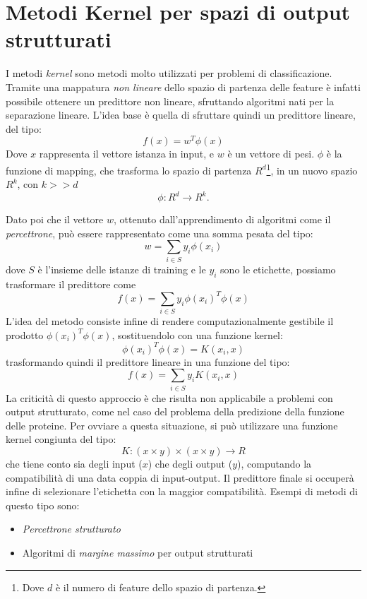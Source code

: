 \documentclass[12pt]{report}
\begin{document}
\section{Metodi Kernel per spazi di output strutturati}
I metodi \emph{kernel} sono metodi molto utilizzati per problemi di classificazione. Tramite una mappatura \emph{non lineare} dello spazio di partenza delle feature è infatti possibile ottenere un predittore non lineare, sfruttando algoritmi nati per la separazione lineare. L'idea base è quella di sfruttare quindi un predittore lineare, del tipo:
\[
f(x) = w^T \phi(x)
\]
Dove $x$ rappresenta il vettore istanza in input, e $w$ è un vettore di pesi. $\phi$ è la funzione di mapping, che trasforma lo spazio di partenza $R^d$\footnote{\footnotesize{Dove $d$ è il numero di feature dello spazio di partenza.}}, in un nuovo spazio $R^k$, con $k>>d$
\[
\phi : R^d \rightarrow R^k.
\]

Dato poi che il vettore $w$, ottenuto dall'apprendimento di algoritmi come il \emph{percettrone}\cite{PERC}, può essere rappresentato come una somma pesata del tipo:
\[
w = \sum_{i \in S} y_i \phi(x_i)
\]
dove $S$ è l'insieme delle istanze di training e le $y_i$ sono le etichette, possiamo trasformare il predittore come
\[
f(x) = \sum_{i\in S} y_i \phi(x_i)^T \phi(x)
\]
L'idea del metodo consiste infine di rendere computazionalmente gestibile il prodotto $\phi(x_i)^T \phi(x)$, sostituendolo con una funzione kernel:
\[
\phi(x_i)^T \phi(x) = K(x_i, x)
\]
trasformando quindi il predittore lineare in una funzione del tipo:
\[
f(x) = \sum_{i \in S} y_i K(x_i, x)
\]
La criticità di questo approccio è che risulta non applicabile a problemi con output strutturato, come nel caso del problema della predizione della funzione delle proteine. Per ovviare a questa situazione, si può utilizzare una funzione kernel congiunta del tipo:
\[
K : (x \times y) \times (x \times y) \rightarrow R
\]
che tiene conto sia degli input ($x$) che degli output ($y$), computando la compatibilità di una data coppia di input-output. Il predittore finale si occuperà infine di selezionare l'etichetta con la maggior compatibilità.
\newline
\newline
Esempi di metodi di questo tipo sono:
\begin{itemize}
\item \emph{Percettrone strutturato} \cite{perceptron}
\item Algoritmi di \emph{margine massimo} per output strutturati \cite{marginemassimo}
\end{itemize}
\end{document}
